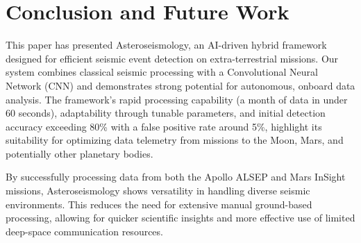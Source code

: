 \documentclass[conference]{IEEEtran}
\begin{document}
\section{Conclusion and Future Work}
This paper has presented Asteroseismology, an AI-driven hybrid framework designed for efficient seismic event detection
on extra-terrestrial missions. Our system combines classical seismic processing with a Convolutional Neural
Network (CNN) and demonstrates strong potential for autonomous, onboard data analysis. The framework's rapid processing
capability (a month of data in under 60 seconds), adaptability through tunable parameters, and initial detection
accuracy exceeding 80\% with a false positive rate around 5\%, highlight its suitability for optimizing data telemetry
from missions to the Moon, Mars, and potentially other planetary bodies.

By successfully processing data from both the Apollo ALSEP and Mars InSight missions, Asteroseismology shows versatility
in handling diverse seismic environments. This reduces the need for extensive manual ground-based processing, allowing
for quicker scientific insights and more effective use of limited deep-space communication resources.
\end{document}
